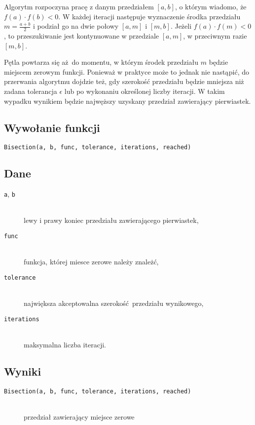 \documentclass[12pt]{article}
\begin{document}
			Algorytm rozpoczyna pracę z danym przedziałem $[a, b]$,
			o którym wiadomo, że $f(a) \cdot f(b) < 0$.
			W każdej iteracji następuje wyznaczenie środka przedziału $m = \frac{a+b}{2}$
			i podział go na dwie połowy $[a, m]$ i $[m, b]$.
			Jeżeli $f(a) \cdot f(m) < 0$, to przeszukiwanie jest kontynuowane
			w przedziale $[a, m]$, w przeciwnym razie $[m, b]$.

			Pętla powtarza się aż do momentu, w którym środek przedziału $m$ będzie miejscem zerowym funkcji.
			Ponieważ w praktyce może to jednak nie nastąpić, do przerwania algorytmu dojdzie też,
			gdy szerokość przedziału będzie mniejsza niż zadana tolerancja $\epsilon$
			lub po wykonaniu określonej liczby iteracji.
			W takim wypadku wynikiem będzie najwęższy uzyskany przedział zawierający pierwiastek.

		\subsection{Wywołanie funkcji}
			\texttt{Bisection(a, b, func, tolerance, iterations, reached)}

		\subsection{Dane}
			\begin{description}
				\item[\texttt{a}, \texttt{b}] \hfill\\ lewy i prawy koniec przedziału zawierającego pierwiastek,
				\item[\texttt{func}] \hfill\\ funkcja, której miesce zerowe należy znależć,
				\item[\texttt{tolerance}] \hfill\\ największa akceptowalna szerokość przedziału wynikowego,
				\item[\texttt{iterations}] \hfill\\ maksymalna liczba iteracji.
			\end{description}

		\subsection{Wyniki}
			\begin{description}
				\item[\texttt{Bisection(a, b, func, tolerance, iterations, reached)}] \hfill\\
					przedział zawierający miejsce zerowe
			\end{description}
\end{document}
